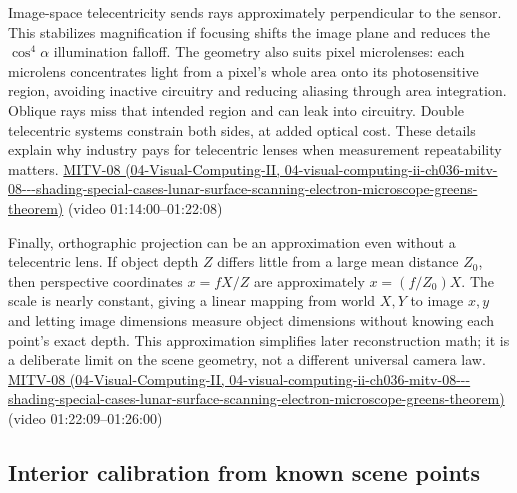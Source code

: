 Image-space telecentricity sends rays approximately perpendicular to the sensor. This stabilizes magnification if focusing shifts the image plane and reduces the \(\cos^4\alpha\) illumination falloff. The geometry also suits pixel microlenses: each microlens concentrates light from a pixel's whole area onto its photosensitive region, avoiding inactive circuitry and reducing aliasing through area integration. Oblique rays miss that intended region and can leak into circuitry. Double telecentric systems constrain both sides, at added optical cost. These details explain why industry pays for telecentric lenses when measurement repeatability matters. \href{../04-Visual-Computing-II/main.pdf\#nameddest=04-visual-computing-ii-ch036-mitv-08---shading-special-cases-lunar-surface-scanning-electron-microscope-greens-theorem}{MITV-08 (04-Visual-Computing-II, 04-visual-computing-ii-ch036-mitv-08-\/-\/-shading-special-cases-lunar-surface-scanning-electron-microscope-greens-theorem)} (video 01:14:00--01:22:08)

Finally, orthographic projection can be an approximation even without a telecentric lens. If object depth \(Z\) differs little from a large mean distance \(Z_0\), then perspective coordinates \(x=fX/Z\) are approximately \(x=(f/Z_0)X\). The scale is nearly constant, giving a linear mapping from world \(X,Y\) to image \(x,y\) and letting image dimensions measure object dimensions without knowing each point's exact depth. This approximation simplifies later reconstruction math; it is a deliberate limit on the scene geometry, not a different universal camera law. \href{../04-Visual-Computing-II/main.pdf\#nameddest=04-visual-computing-ii-ch036-mitv-08---shading-special-cases-lunar-surface-scanning-electron-microscope-greens-theorem}{MITV-08 (04-Visual-Computing-II, 04-visual-computing-ii-ch036-mitv-08-\/-\/-shading-special-cases-lunar-surface-scanning-electron-microscope-greens-theorem)} (video 01:22:09--01:26:00)

\subsection{Interior calibration from known scene points}\label{03-visual-computing-i-ch003-interior-calibration-from-known-scene-points}

